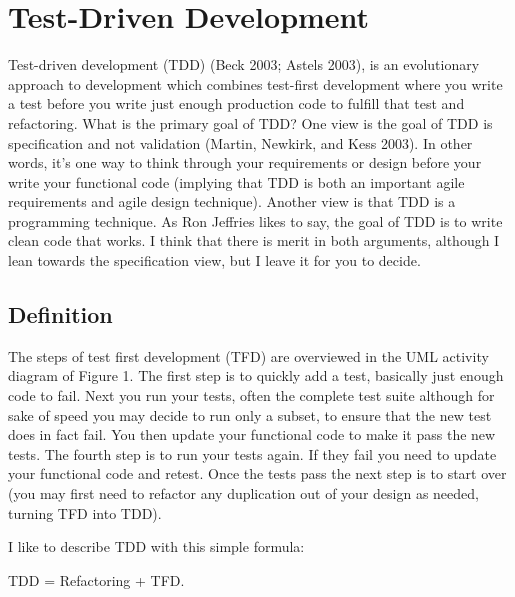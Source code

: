 \section{Test-Driven Development}
Test-driven development (TDD) (Beck 2003; Astels 2003), is an evolutionary approach to development which combines test-first development where you write a test before you write just enough production code to fulfill that test and refactoring.   What is the primary goal of TDD?  One view is the goal of TDD is specification and not validation (Martin, Newkirk, and Kess 2003).  In other words, it’s one way to think through your requirements or design before your write your functional code (implying that TDD is both an important agile requirements and agile design technique). Another view is that TDD is a programming technique.  As Ron Jeffries likes to say, the goal of TDD is to write clean code that works. I think that there is merit in both arguments, although I lean towards the specification view, but I leave it for you to decide.
\subsection{Definition}
The steps of test first development (TFD) are overviewed in the UML activity diagram of Figure 1.  The first step is to quickly add a test, basically just enough code to fail.  Next you run your tests, often the complete test suite although for sake of speed you may decide to run only a subset, to ensure that the new test does in fact fail. You then update your functional code to make it pass the new tests. The fourth step is to run your tests again. If they fail you need to update your functional code and retest. Once the tests pass the next step is to start over (you may first need to refactor any duplication out of your design as needed, turning TFD into TDD).

I like to describe TDD with this simple formula:

  TDD = Refactoring + TFD.

